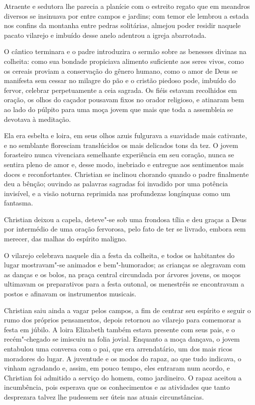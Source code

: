 Atraente e sedutora lhe parecia a planície com o estreito regato que em
meandros diversos se insinuava por entre campos e jardins; com temor
ele lembrou a estada nos confins da montanha entre pedras solitárias,
almejou poder residir naquele pacato vilarejo e imbuído desse anelo
adentrou a igreja abarrotada.

O cântico terminara e o padre introduzira o sermão sobre as benesses
divinas na colheita: como sua bondade propiciava alimento suficiente
aos seres vivos, como os cereais proviam a conservação do gênero
\mbox{humano}, como o amor de Deus se manifesta sem cessar no milagre do pão e
o cristão piedoso pode, imbuído do fervor, celebrar perpetuamente a
ceia sagrada. Os fiéis estavam recolhidos em oração, os olhos do
caçador pousavam fixos no orador religioso, e atinaram bem ao lado do
púlpito para uma moça jovem que mais que toda a assembleia se devotava
à meditação.

Ela era esbelta e loira, em seus olhos azuis fulgurava a suavidade mais
cativante, e no semblante floresciam translúcidos os mais delicados
tons da tez. O jovem forasteiro nunca vivenciara semelhante experiência
em seu coração, nunca se sentira pleno de amor e, desse modo, inebriado
e entregue aos sentimentos mais doces e reconfortantes. Christian se
inclinou chorando quando o padre finalmente deu a bênção; ouvindo as
palavras sagradas foi invadido por uma potência invisível, e a visão
noturna reprimida nas profundezas longínquas como um fantasma.

Christian deixou a capela, deteve"-se sob uma frondosa tília e deu graças
a Deus por intermédio de uma oração fervorosa, pelo fato de ter se
livrado, embora sem merecer, das malhas do espírito maligno.

O vilarejo celebrava naquele dia a festa da colheita, e todos os
habitantes do lugar mostravam"-se animados e bem"-humorados; as crianças
se alegravam com as danças e os bolos, na praça central circundada por
árvores jovens, os moços ultimavam os preparativos para a festa
outonal, os menestréis se encontravam a postos e afinavam os
instrumentos musicais.

Christian saiu ainda a vagar pelos campos, a fim de centrar seu espírito
e seguir o rumo dos próprios \mbox{pensamentos}, depois retornou ao vilarejo
para \mbox{comemorar} a festa em júbilo. A loira Elizabeth também estava
presente com seus pais, e o recém"-chegado se imiscuiu na folia jovial.
Enquanto a moça dançava, o jovem entabulou uma conversa com o pai, que
era arrendatário, um dos mais ricos moradores do lugar. A juventude e
os modos do rapaz, ao que tudo indicava, o vinham agradando e, assim, em
pouco tempo, eles entraram num acordo, e Christian foi admitido a
serviço do homem, como jardineiro. O rapaz aceitou a incumbência, pois
esperava que os conhecimentos e as atividades que tanto desprezara
talvez lhe pudessem ser úteis nas atuais circunstâncias.

